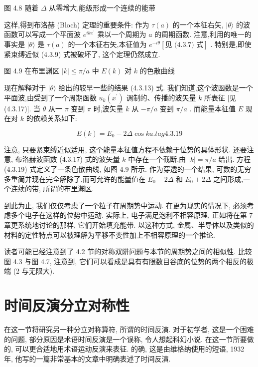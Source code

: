 图 4.8 随着 $\Delta$ 从零增大,能级形成一个连续的能带

这样,得到布洛赫 (Bloch) 定理的重要条件: 作为 $\tau \left( a\right)$ 的一个本征右矢, $|\theta \rangle$ 的波函数可以写成一个平面波 ${e}^{{ik}{x}^{\prime }}$ 乘以一个周期为 $a$ 的周期函数. 注意,利用的唯一的事实是 $|\theta \rangle$ 是 $\tau \left( a\right)$ 的一个本征右矢,本征值为 ${e}^{-{i\theta }}\left\lbrack \text{见 (4.3.7) 式}\right\rbrack$ . 特别是,即使紧束缚近似 (4.3.9) 式被破坏了, 这个定理仍然成立.


图 4.9 在布里渊区 $\left| k\right| \leq \pi /a$ 中 $E\left( k\right)$ 对 $k$ 的色散曲线

现在解释对于 $|\theta \rangle$ 给出的较早一些的结果 (4.3.13) 式. 我们知道,这个波函数是一个平面波,由受到了一个周期函数 ${u}_{k}\left( {x}^{\prime }\right)$ 调制的、传播的波矢量 $k$ 所表征 [见 (4.3.17)]. 当 $\theta$ 从一 $\pi$ 变到 $\pi$ 时,波矢量 $k$ 从 $- \pi /a$ 变到 $\pi /a$ . 而能量本征值 $E$ 现在对 $k$ 的依赖关系如下:

$$
E\left( k\right) = {E}_{0} - {2\Delta }\cos {ka}. tag{4.3.19}
$$

注意, 只要紧束缚近似适用, 这个能量本征值方程不依赖于位势的具体形状. 还要注意, 布洛赫波函数 (4.3.17) 式的波矢量 $k$ 中存在一个截断,由 $\left| k\right| = \pi /a$ 给出. 方程 (4.3.19) 式定义了一条色散曲线, 如图 4.9 所示. 作为穿透的一个结果, 可数的无穷多重简并现在完全解除了,而可允许的能量值在 ${E}_{0} - {2\Delta }$ 和 ${E}_{0} + {2\Delta }$ 之间形成,一个连续的带, 所谓的布里渊区.

到此为止, 我们仅仅考虑了一个粒子在周期势中运动. 在更为现实的情况下, 必须考虑多个电子在这样的位势中运动. 实际上, 电子满足泡利不相容原理, 正如将在第 7 章更系统地讨论的那样, 它们开始填充能带. 以这种方式, 金属、半导体以及类似的材料的定性特点可以被理解为平移不变性加上不相容原理的一个推论.

读者可能已经注意到了 4.2 节的对称双阱问题与本节的周期势之间的相似性. 比较图 4.3 与图 4.7, 注意到, 它们可以看成是具有有限数目谷底的位势的两个相反的极端 (2 与无限大).

\section{时间反演分立对称性}

在这一节将研究另一种分立对称算符, 所谓的时间反演. 对于初学者, 这是一个困难的问题, 部分原因是术语时间反演是一个误称, 令人想起科幻小说. 在这一节所要做的, 可以更合适地用术语运动反演来表征. 的确, 这是由维格纳使用的短语, 1932 年, 他写的一篇非常基本的文章中明确表述了时间反演.

